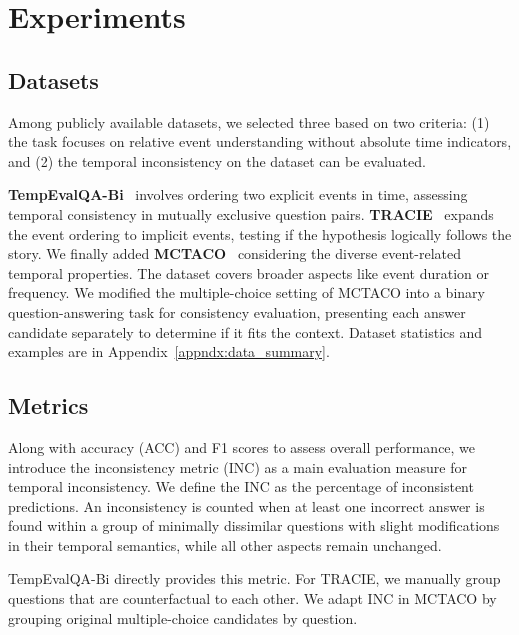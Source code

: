 \section{Experiments}



\subsection{Datasets}

Among publicly available datasets, we selected three based on two criteria: (1) the task focuses on relative event understanding without absolute time indicators, and (2) the temporal inconsistency on the dataset can be evaluated.

\textbf{TempEvalQA-Bi}~\cite{qiu-etal-2024-large} involves ordering two explicit events in time, assessing temporal consistency in mutually exclusive question pairs.
\textbf{TRACIE}~\cite{zhou2021temporal} expands the event ordering to implicit events, testing if the hypothesis logically follows the story. 
We finally added \textbf{MCTACO}~\cite{zhou2019going} considering the diverse event-related temporal properties. %
The dataset covers broader aspects like event duration or frequency.
We modified the multiple-choice setting of MCTACO into a binary question-answering task for consistency
evaluation, presenting each answer candidate separately to determine if it fits the context. Dataset statistics and examples are in Appendix~\ref{appndx:data_summary}.



\subsection{Metrics}
Along with accuracy (ACC) and F1 scores to assess overall performance, we introduce the inconsistency metric (INC) as a main evaluation measure for temporal inconsistency. We define the INC as the percentage of inconsistent predictions. An inconsistency is counted when at least one incorrect answer is found within a group of minimally dissimilar questions with slight modifications in their temporal semantics, while all other aspects remain unchanged.

TempEvalQA-Bi directly provides this metric. For TRACIE, we manually group questions that are counterfactual to each other. 
We adapt INC in MCTACO by grouping original multiple-choice candidates by question. 

